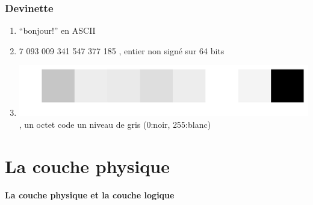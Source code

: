 \documentclass{beamer}
\begin{document}
\begin{frame}
\frametitle{Devinette}

\begin{enumerate}
	\item<2-> ``bonjour!'' en ASCII
	\item<3-> 7 093 009 341 547 377 185 , entier non signé sur 64 bits
        \item<4-> \includegraphics[width=0.3\linewidth]{Figs/code_img.pdf}, un octet code un niveau de gris (0:noir, 255:blanc)
\end{enumerate}
\end{frame}


\section{La couche physique}

\begin{frame}
\begin{center}
\textbf{La couche physique et la couche logique}
\end{center}
\end{frame}
\end{document}
